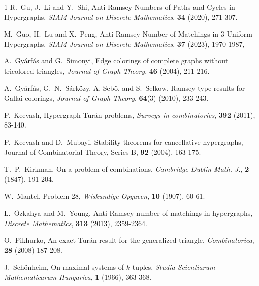 \documentclass[10pt,a4paper]{article}
\theoremstyle{definition}
\begin{document}
\begin{thebibliography}{1}
     R.~Gu, J.~Li and Y.~Shi, Anti-Ramsey Numbers of Paths and Cycles in Hypergraphs, {\em SIAM Journal on Discrete Mathematics}, {\bf 34} (2020), 271-307.

     M.~Guo, H.~Lu and X.~Peng, Anti-Ramsey Number of Matchings in 3-Uniform Hypergraphs, {\em SIAM Journal on Discrete Mathematics}, {\bf 37} (2023), 1970-1987,

     A.~Gy\'arfás and G.~Simonyi, Edge colorings of complete graphs without tricolored triangles, {\em Journal of Graph Theory}, {\bf 46} (2004), 211-216.

     A.~Gy\'arfás, G.~N.~S\'ark\"ozy, A. Seb\H{o}, and S.~Selkow, Ramsey-type results for Gallai colorings, {\em Journal of Graph Theory}, {\bf 64}(3) (2010), 233-243.

     P.~Keevash, Hypergraph Tur\'an problems, {\em Surveys in combinatorics}, {\bf 392} (2011), 83-140.

     P.~Keevash and D.~Mubayi, Stability theorems for cancellative hypergraphs, {Journal of Combinatorial Theory, Series B}, {\bf 92} (2004), 163-175.

     T.~P.~Kirkman, On a problem of combinations, {\em Cambridge Dublin Math. J.}, {\bf 2} (1847), 191-204.



     W.~Mantel, Problem 28, {\em Wiskundige Opgaven}, {\bf 10} (1907), 60-61.

     L.~{\"O}zkahya and M.~Young, Anti-Ramsey number of matchings in hypergraphs, {\em Discrete Mathematics}, {\bf 313} (2013), 2359-2364.

     O.~Pikhurko, An exact Tur\'an result for the generalized triangle, {\em Combinatorica}, {\bf 28} (2008) 187-208.

     J.~Sch\"onheim, On maximal systems of $k$-tuples, {\em Studia Scientiarum Mathematicarum Hungarica}, {\bf 1} (1966), 363-368.



\end{thebibliography}
\end{document}

